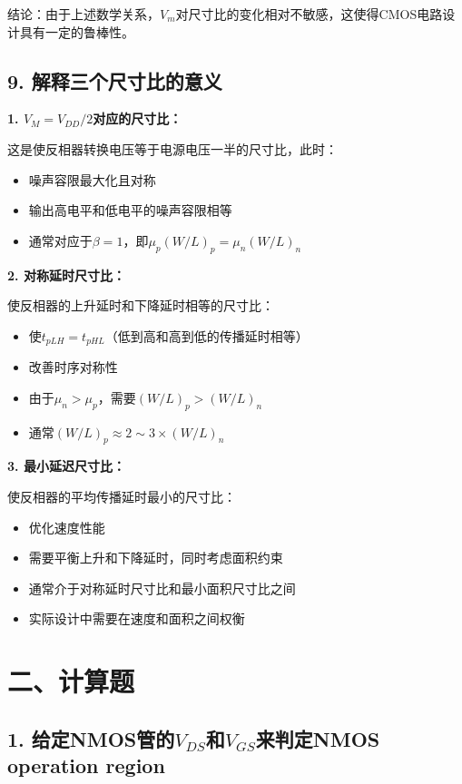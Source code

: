 \documentclass[UTF8,12pt,a4paper]{ctexart}
\begin{document}
结论：由于上述数学关系，$V_m$对尺寸比的变化相对不敏感，这使得CMOS电路设计具有一定的鲁棒性。

\subsection*{9. 解释三个尺寸比的意义}

\textbf{1. $V_M = V_{DD}/2$对应的尺寸比：}

这是使反相器转换电压等于电源电压一半的尺寸比，此时：
\begin{itemize}
    \item 噪声容限最大化且对称
    \item 输出高电平和低电平的噪声容限相等
    \item 通常对应于$\beta = 1$，即$\mu_p (W/L)_p = \mu_n (W/L)_n$
\end{itemize}

\textbf{2. 对称延时尺寸比：}

使反相器的上升延时和下降延时相等的尺寸比：
\begin{itemize}
    \item 使$t_{pLH} = t_{pHL}$（低到高和高到低的传播延时相等）
    \item 改善时序对称性
    \item 由于$\mu_n > \mu_p$，需要$(W/L)_p > (W/L)_n$
    \item 通常$(W/L)_p \approx 2\sim3 \times (W/L)_n$
\end{itemize}

\textbf{3. 最小延迟尺寸比：}

使反相器的平均传播延时最小的尺寸比：
\begin{itemize}
    \item 优化速度性能
    \item 需要平衡上升和下降延时，同时考虑面积约束
    \item 通常介于对称延时尺寸比和最小面积尺寸比之间
    \item 实际设计中需要在速度和面积之间权衡
\end{itemize}

\section*{二、计算题}

\subsection*{1. 给定NMOS管的$V_{DS}$和$V_{GS}$来判定NMOS operation region}
\end{document}
